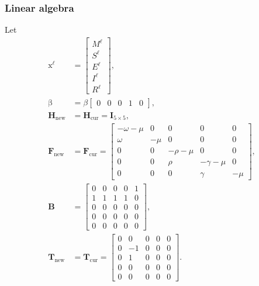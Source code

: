 \documentclass[USenglish]{article}
\renewcommand{\vec}[1]{\boldsymbol{\mathrm{#1}}}
\newcommand{\mat}[1]{\mathbf{#1}}
\begin{document}
\subsubsection{Linear algebra}

Let
\begin{subequations}
  \begin{align}
    \vec{x}^{\ell} &=
    \begin{bmatrix}
      M^{\ell} \\ S^{\ell} \\ E^{\ell} \\ I^{\ell} \\ R^{\ell}
    \end{bmatrix},
    \\
    \vec{\beta} &=
    \beta
    \begin{bmatrix}
      0 & 0 & 0 & 1 & 0
    \end{bmatrix},
    \\
    \mat{H}_{\mathrm{new}} &=
    \mat{H}_{\mathrm{cur}} =
    \mat{I}_{5 \times 5},
    \\
    \mat{F}_{\mathrm{new}} &=
    \mat{F}_{\mathrm{cur}} =
    \begin{bmatrix}
      - \omega - \mu & 0 & 0 & 0 & 0 \\
      \omega & - \mu & 0 & 0 & 0 \\
      0 & 0 & - \rho - \mu & 0 & 0 \\
      0 & 0 & \rho & - \gamma - \mu & 0 \\
      0 & 0 & 0 & \gamma & - \mu
    \end{bmatrix},
    \\
    \mat{B} &=
    \begin{bmatrix}
      0 & 0 & 0 & 0 & 1 \\
      1 & 1 & 1 & 1 & 0 \\
      0 & 0 & 0 & 0 & 0 \\
      0 & 0 & 0 & 0 & 0 \\
      0 & 0 & 0 & 0 & 0
    \end{bmatrix},
    \\
    \mat{T}_{\mathrm{new}} &=
    \mat{T}_{\mathrm{cur}} =
    \begin{bmatrix}
      0 & 0 & 0 & 0 & 0 \\
      0 & -1 & 0 & 0 & 0 \\
      0 & 1 & 0 & 0 & 0 \\
      0 & 0 & 0 & 0 & 0 \\
      0 & 0 & 0 & 0 & 0
    \end{bmatrix}.
  \end{align}
\end{subequations}
\end{document}
